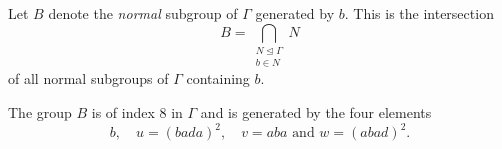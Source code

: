 Let $B$ denote the \emph{normal} subgroup of $\Gamma$ generated by $b$. This is the intersection
\begin{equation*}
B=\bigcap_{\substack{N\unlhd\Gamma\\b\in N}}N
\end{equation*}
of all normal subgroups of $\Gamma$ containing $b$.
\begin{lem}\label{thm:B}
The group $B$ is of index $8$ in $\Gamma$ and is generated by the four elements
\begin{equation*}
b,\quad u=(bada)^2,\quad v=aba \text{ and } w=(abad)^2.
\end{equation*}
\end{lem}
